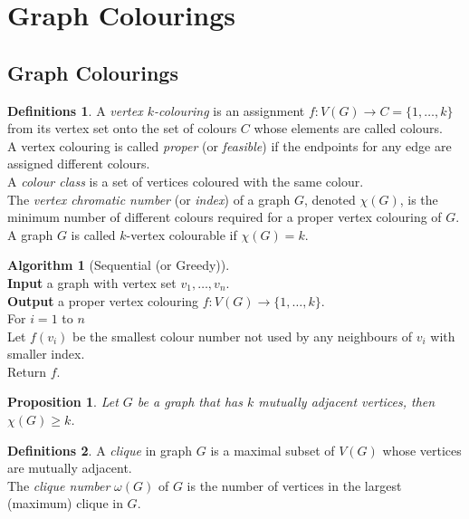 \documentclass{article}
\newtheorem*{prop}{Proposition}
\theoremstyle{definition}
\newtheorem*{defns}{Definitions}
\newtheorem*{alg}{Algorithm}
\begin{document}
\section{Graph Colourings}

\subsection{Graph Colourings}

\begin{defns}
A \emph{vertex $k$-colouring} is an assignment $f\colon V(G)\to C=\{1,\ldots,k\}$ from its vertex set onto the set of colours $C$ whose elements are called colours. \\
A vertex colouring is called \emph{proper} (or \emph{feasible}) if the endpoints for any edge are assigned different colours.\\
A \emph{colour class} is a set of vertices coloured with the same colour. \\
The \emph{vertex chromatic number} (or \emph{index}) of a graph $G$, denoted $\chi(G)$, is the minimum number of different colours required for a proper vertex colouring of $G$. \\
A graph $G$ is called $k$-vertex colourable if $\chi(G) = k$.
\end{defns}

\begin{alg}[Sequential (or Greedy)]~\\
\textbf{Input} a graph with vertex set $v_1,\ldots,v_n$. \\
\textbf{Output} a proper vertex colouring $f\colon V(G)\to \{1,\ldots,k\}$. \\
For $i = 1$ to $n$ \\
\indent Let $f(v_i)$ be the smallest colour number not used by any neighbours of $v_i$ with smaller index. \\
Return $f$.
\end{alg}

\begin{prop}
Let $G$ be a graph that has $k$ mutually adjacent vertices, then $\chi(G) \ge k$.
\end{prop}

\begin{defns}
A \emph{clique} in graph $G$ is a maximal subset of $V(G)$ whose vertices are mutually adjacent. \\
The \emph{clique number} $\omega(G)$ of $G$ is the number of vertices in the largest (maximum) clique in $G$.
\end{defns}
\end{document}
